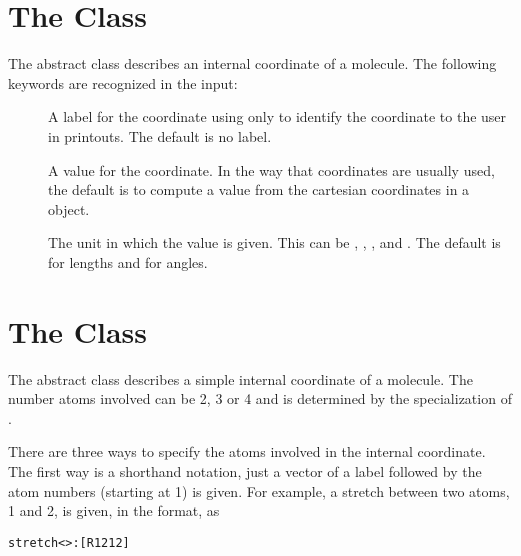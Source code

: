 
\section{The  Class}\label{IntCoor}

The  abstract class describes an internal coordinate of a
molecule.  The following keywords are recognized in the input:

\begin{description}
  \item[] A label for the coordinate using only to
     identify the coordinate to the user in printouts.  The default
     is no label.

  \item[] A value for the coordinate.  In the way that
     coordinates are usually used, the default is to compute a value
     from the cartesian coordinates in a  object.

  \item[] The unit in which the value is given.  This can be
     , , , and .
     The default is  for lengths and  for angles.

\end{description}


\section{The  Class}\label{SimpleCo}

The  abstract class describes a simple internal coordinate
of a molecule.  The number atoms involved can be 2, 3 or 4 and is
determined by the specialization of .

There are three ways to specify the atoms involved in the internal
coordinate.  The first way is a shorthand notation, just a vector of a
label followed by the atom numbers (starting at 1) is given.  For example,
a stretch between two atoms, 1 and 2, is given, in the
 format, as
\begin{alltt}
  stretch<>: [ R12 1 2 ]
\end{alltt}

